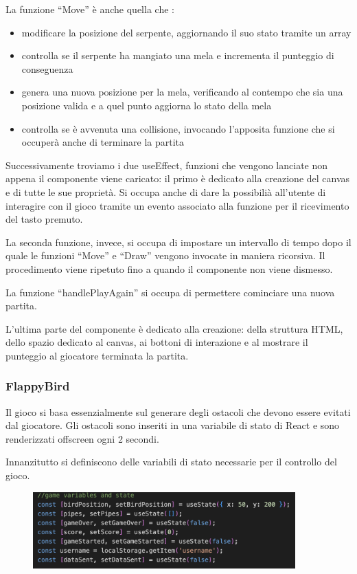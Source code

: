 \documentclass{article}
\begin{document}
La funzione “Move” è anche quella che :
\begin{itemize}
    \item modificare la posizione del serpente, aggiornando il suo stato tramite un array
    \item controlla se il serpente ha mangiato una mela e incrementa il punteggio di conseguenza
    \item genera una nuova posizione per la mela, verificando al contempo che sia una posizione valida e a quel punto aggiorna lo stato della mela
    \item controlla se è avvenuta una collisione, invocando l’apposita funzione che si occuperà anche di terminare la partita
\end{itemize}

Successivamente troviamo i due useEffect, funzioni che vengono lanciate non appena il componente viene caricato: il primo è dedicato alla creazione del canvas e di tutte le sue proprietà.
Si occupa anche di dare la possibilià all’utente di interagire con il gioco tramite un evento associato alla funzione per il ricevimento del tasto premuto.

La seconda funzione, invece, si occupa di impostare un intervallo di tempo dopo il quale le funzioni “Move” e “Draw” vengono invocate in maniera ricorsiva.
Il procedimento viene ripetuto fino a quando il componente non viene dismesso.

La funzione “handlePlayAgain” si occupa di permettere cominciare una nuova partita.

L’ultima parte del componente è dedicato alla creazione: della struttura HTML, dello spazio dedicato al canvas, ai bottoni di interazione e al mostrare il punteggio al giocatore terminata la partita.



\subsubsection{FlappyBird}
Il gioco si basa essenzialmente sul generare degli ostacoli che devono essere evitati dal giocatore. 
Gli ostacoli sono inseriti in una variabile di stato di React e sono renderizzati offscreen ogni 2 secondi.

Innanzitutto si definiscono delle variabili di stato necessarie per il controllo del gioco.
\begin{figure}[H]
    \centering
    \includegraphics[width=0.9\textwidth]{images/Flappy_variables.png}
\end{figure}
\end{document}
